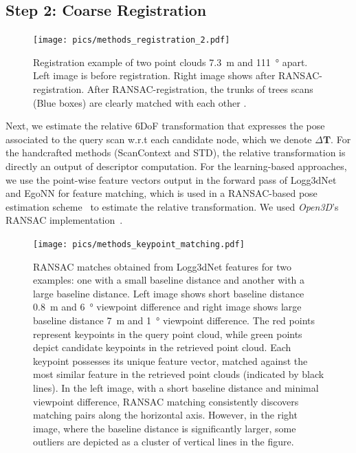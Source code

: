 \subsection*{\textbf{Step 2: Coarse Registration}}
\label{subsubsec:coarse-registration}
\begin{figure}[htbp]
  \centering
  \texttt{[image: pics/methods\_registration\_2.pdf]}
  \caption{Registration example of two point clouds \SI{7.3}{\meter} and \SI{111}{\degree} apart. Left image is before registration. Right image shows after RANSAC-registration. After RANSAC-registration, the trunks of trees scans (Blue boxes) are clearly matched with each other . }
  \label{fig:registration_example}
\end{figure}
\noindent Next, we estimate the relative 6DoF transformation that expresses the pose associated to the query scan w.r.t each candidate node, which we denote $\Delta \mathbf{T}$. For the handcrafted methods (ScanContext and STD), the relative transformation is directly an output of descriptor computation. For the learning-based approaches, we use the point-wise feature vectors output in the forward pass of Logg3dNet and EgoNN for feature matching, which is used in a RANSAC-based pose estimation scheme~\cite{fischler1981ransac} to estimate the relative transformation. We used \emph{Open3D}'s RANSAC implementation~\cite{zhou2018}.  
\begin{figure}[htbp]
  \centering
  \texttt{[image: pics/methods\_keypoint\_matching.pdf]}
  \caption{RANSAC matches obtained from Logg3dNet features for two examples: one with a small baseline distance and another with a large baseline distance. Left image shows short baseline distance \SI{0.8}{\meter} and \SI{6}{\degree} viewpoint difference and right image shows large baseline distance \SI{7}{\meter} and \SI{1}{\degree} viewpoint difference. 
  The red points represent keypoints in the query point cloud, while green points depict candidate keypoints in the retrieved point cloud. Each keypoint possesses its unique feature vector, matched against the most similar feature in the retrieved point clouds (indicated by black lines). In the left image, with a short baseline distance and minimal viewpoint difference, RANSAC matching consistently discovers matching pairs along the horizontal axis. However, in the right image, where the baseline distance is significantly larger, some outliers are depicted as a cluster of vertical lines in the figure.}
  \label{fig:RANSAC_keypoint_matching}
\end{figure}

